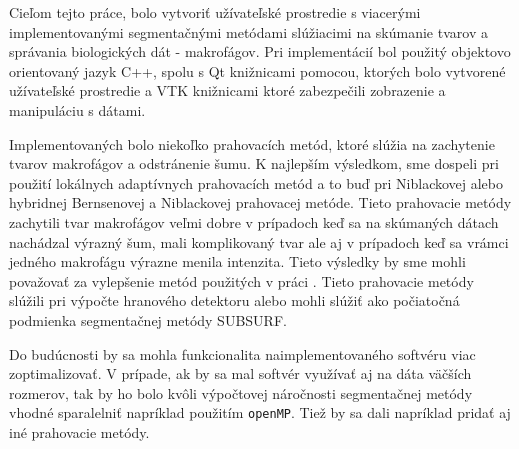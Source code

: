 \documentclass[a4paper,11pt,oneside]{article}%
\begin{document}
Cieľom tejto práce, bolo vytvoriť užívateľské prostredie s viacerými implementovanými segmentačnými metódami slúžiacimi na skúmanie tvarov a správania biologických dát - makrofágov. Pri implementácií bol použitý objektovo orientovaný jazyk C++, spolu s Qt knižnicami pomocou, ktorých bolo vytvorené užívateľské prostredie a VTK knižnicami ktoré zabezpečili zobrazenie a manipuláciu s dátami.

Implementovaných bolo niekoľko prahovacích metód, ktoré slúžia na zachytenie tvarov makrofágov a odstránenie šumu. K najlepším výsledkom, sme dospeli pri použití lokálnych adaptívnych prahovacích metód a to buď pri Niblackovej alebo hybridnej Bernsenovej a Niblackovej prahovacej metóde. Tieto prahovacie metódy zachytili tvar makrofágov veľmi dobre v prípadoch keď sa na skúmaných dátach nachádzal výrazný šum, mali komplikovaný tvar ale aj v prípadoch keď sa vrámci jedného makrofágu výrazne menila intenzita. Tieto výsledky by sme mohli považovať za vylepšenie metód použitých v práci \cite{sora}. Tieto prahovacie metódy slúžili pri výpočte hranového detektoru alebo mohli slúžiť ako počiatočná podmienka segmentačnej metódy SUBSURF. 

Do budúcnosti by sa mohla funkcionalita naimplementovaného softvéru viac zoptimalizovať. V prípade, ak by sa mal softvér využívať aj na dáta väčších rozmerov, tak by ho bolo kvôli výpočtovej náročnosti segmentačnej metódy vhodné sparalelniť napríklad použitím \texttt{openMP}. Tiež by sa dali napríklad pridať aj iné prahovacie metódy.
\end{document}
